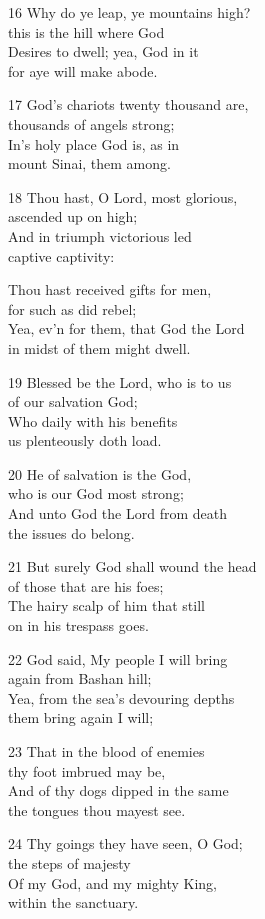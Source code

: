 16 Why do ye leap, ye mountains high?\\
this is the hill where God\\
Desires to dwell; yea, God in it\\
for aye will make abode.

17 God’s chariots twenty thousand are,\\
thousands of angels strong;\\
In’s holy place God is, as in\\
mount Sinai, them among.

18 Thou hast, O Lord, most glorious,\\
ascended up on high;\\
And in triumph victorious led\\
captive captivity:

Thou hast received gifts for men,\\
for such as did rebel;\\
Yea, ev’n for them, that God the Lord\\
in midst of them might dwell.

19 Blessed be the Lord, who is to us\\
of our salvation God;\\
Who daily with his benefits\\
us plenteously doth load.

20 He of salvation is the God,\\
who is our God most strong;\\
And unto God the Lord from death\\
the issues do belong.

21 But surely God shall wound the head\\
of those that are his foes;\\
The hairy scalp of him that still\\
on in his trespass goes.

22 God said, My people I will bring\\
again from Bashan hill;\\
Yea, from the sea’s devouring depths\\
them bring again I will;

23 That in the blood of enemies\\
thy foot imbrued may be,\\
And of thy dogs dipped in the same\\
the tongues thou mayest see.

24 Thy goings they have seen, O God;\\
the steps of majesty\\
Of my God, and my mighty King,\\
within the sanctuary.

